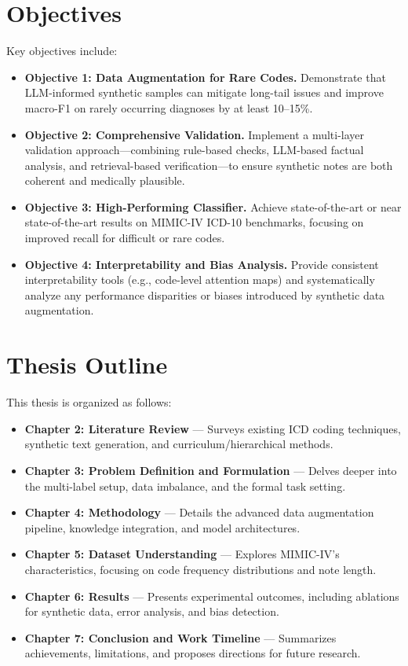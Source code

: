\section{Objectives}
Key objectives include:
\begin{itemize}
    \item \textbf{Objective 1: Data Augmentation for Rare Codes.} Demonstrate that LLM-informed synthetic samples can mitigate long-tail issues and improve macro-F1 on rarely occurring diagnoses by at least 10--15\%.
    \item \textbf{Objective 2: Comprehensive Validation.} Implement a multi-layer validation approach—combining rule-based checks, LLM-based factual analysis, and retrieval-based verification—to ensure synthetic notes are both coherent and medically plausible.
    \item \textbf{Objective 3: High-Performing Classifier.} Achieve state-of-the-art or near state-of-the-art results on MIMIC-IV ICD-10 benchmarks, focusing on improved recall for difficult or rare codes.
    \item \textbf{Objective 4: Interpretability and Bias Analysis.} Provide consistent interpretability tools (e.g., code-level attention maps) and systematically analyze any performance disparities or biases introduced by synthetic data augmentation.
\end{itemize}

\section{Thesis Outline}
This thesis is organized as follows:
\begin{itemize}
    \item \textbf{Chapter 2: Literature Review} --- Surveys existing ICD coding techniques, synthetic text generation, and curriculum/hierarchical methods.
    \item \textbf{Chapter 3: Problem Definition and Formulation} --- Delves deeper into the multi-label setup, data imbalance, and the formal task setting.
    \item \textbf{Chapter 4: Methodology} --- Details the advanced data augmentation pipeline, knowledge integration, and model architectures.
    \item \textbf{Chapter 5: Dataset Understanding} --- Explores MIMIC-IV’s characteristics, focusing on code frequency distributions and note length.
    \item \textbf{Chapter 6: Results} --- Presents experimental outcomes, including ablations for synthetic data, error analysis, and bias detection.
    \item \textbf{Chapter 7: Conclusion and Work Timeline} --- Summarizes achievements, limitations, and proposes directions for future research.
\end{itemize}

